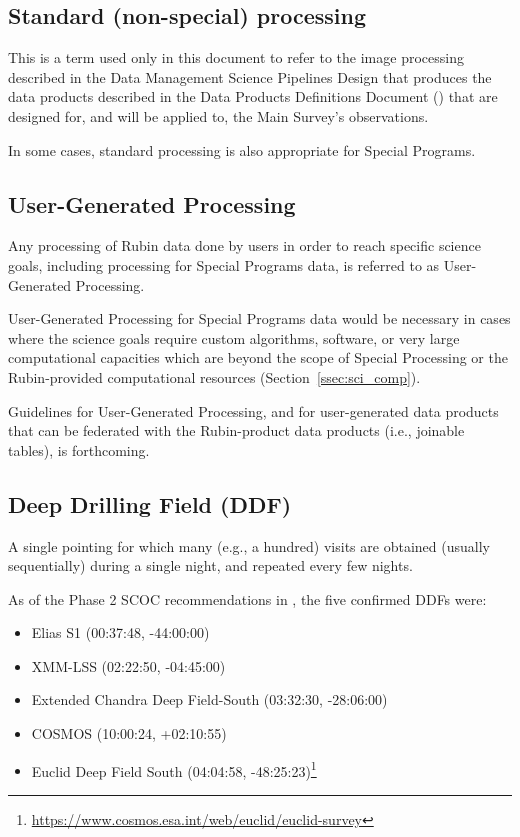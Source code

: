 \subsection{Standard (non-special) processing}\label{ssec:intro_stdproc}

This is a term used only in this document to refer to the image processing 
described in the Data Management Science Pipelines Design  that produces the data products described in the Data Products Definitions Document
() that are designed for, and will be applied to, the Main Survey's observations.

In some cases, standard processing is also appropriate for Special Programs.


\subsection{User-Generated Processing}

Any processing of Rubin data done by users in order to reach specific science goals, including
processing for Special Programs data, is referred to as User-Generated Processing.

User-Generated Processing for Special Programs data would be necessary in cases where
the science goals require custom algorithms, software, or very large computational
capacities which are beyond the scope of Special Processing or the Rubin-provided
computational resources (Section~\ref{ssec:sci_comp}).

Guidelines for User-Generated Processing, and for user-generated data products
that can be federated with the Rubin-product data products (i.e., joinable tables),
is forthcoming.

\subsection{Deep Drilling Field (DDF)}

A single pointing for which many (e.g., a hundred) visits are obtained 
(usually sequentially) during a single night, and repeated every few 
nights.

As of the Phase 2 SCOC recommendations in , the five 
confirmed DDFs were:

\begin{itemize}
\item Elias S1 (00:37:48, -44:00:00)
\item XMM-LSS (02:22:50, -04:45:00)
\item Extended Chandra Deep Field-South (03:32:30, -28:06:00)
\item COSMOS (10:00:24, +02:10:55)
\item Euclid Deep Field South  (04:04:58, -48:25:23)\footnote{\url{https://www.cosmos.esa.int/web/euclid/euclid-survey}}
\end{itemize}

